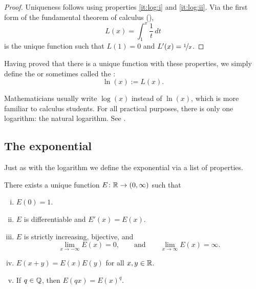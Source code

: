 \begin{proof}
Uniqueness follows using properties \ref{it:log:i} and
\ref{it:log:ii}.  Via the first form of the
fundamental theorem of calculus (),
\begin{equation*}
L(x) = \int_1^x \frac{1}{t}\,dt
\end{equation*}
is the unique function such that $L(1) = 0$ and $L'(x) = \nicefrac{1}{x}$.
\end{proof}

Having proved
that there is a unique function with these properties,
we simply define the \emph{} or sometimes called the
\emph{}:
\begin{equation*}
\ln(x) := L(x) .
\end{equation*}

Mathematicians usually write $\log(x)$ instead of $\ln(x)$, which is
more familiar to calculus students.  For all practical purposes, there is only one logarithm:
the natural logarithm.  See .

\subsection{The exponential}

Just as with the logarithm we define the exponential via a list of
properties.

\begin{prop}
There exists a unique function $E \colon {\mathbb{R}} \to (0,\infty)$ such that
\begin{enumerate}[(i)]
\item \label{it:exp:i}
$E(0) = 1$.
\item \label{it:exp:ii}
$E$ is differentiable and $E'(x) = E(x)$.
\item \label{it:exp:iii}
$E$ is strictly increasing, bijective, and
\begin{equation*}
\lim_{x\to -\infty} E(x) = 0 , \qquad \text{and} \qquad
\lim_{x\to \infty} E(x) = \infty .
\end{equation*}
\item \label{it:exp:iv}
$E(x+y) = E(x)E(y)$ for all $x,y \in {\mathbb{R}}$.
\item \label{it:exp:v}
If $q \in {\mathbb{Q}}$, then
$E(qx) = {E(x)}^q$.
\end{enumerate}
\end{prop}

